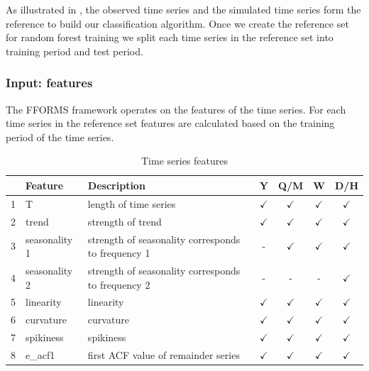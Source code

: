 \documentclass[11pt,a4paper,]{article}
\def\yes{$\checkmark$}
\begin{document}
As illustrated in \textcite{fforms}, the observed time series and the
simulated time series form the reference to build our classification
algorithm. Once we create the reference set for random forest training
we split each time series in the reference set into training period and
test period.

\subsubsection{Input: features}\label{input-features}

The FFORMS framework operates on the features of the time series. For
each time series in the reference set features are calculated based on
the training period of the time series.

\begin{table}[!htp]
\centering\footnotesize\tabcolsep=0.12cm
\caption{Time series features}
\label{feature}
\begin{tabular}{llp{}cccc}
\toprule
\multicolumn{2}{c}{Feature} & Description & Y & Q/M & W & D/H\\
\midrule
1  & T              & length of time series                                                                   & \yes  & \yes & \yes & \yes\\
2  & trend          & strength of trend                                                                       & \yes  & \yes & \yes & \yes\\
3  & seasonality 1    & strength of seasonality corresponds to frequency 1                                                              & -     & \yes & \yes & \yes\\
4  & seasonality 2    & strength of seasonality corresponds to frequency 2                                                              & -     & - & -& \yes\\
5  & linearity      & linearity                                                                               & \yes  & \yes & \yes & \yes\\
6  & curvature      & curvature                                                                               & \yes  & \yes & \yes & \yes\\
7  & spikiness      & spikiness                                                                               & \yes  & \yes & \yes & \yes\\
8  & e\_acf1        & first ACF value of remainder series                                                     & \yes  & \yes & \yes & \yes\\

\end{tabular}
\end{table}
\end{document}
